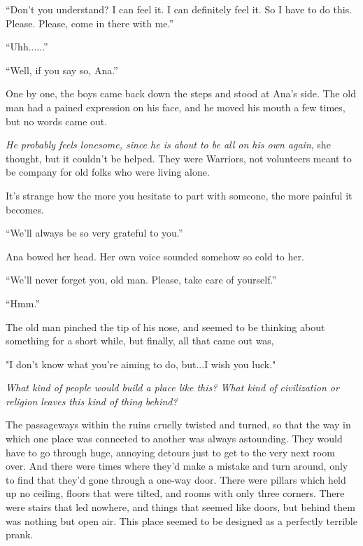 \documentclass[
]{article}
\begin{document}
``Don't you understand? I can feel it. I can definitely feel it. So I
have to do this. Please. Please, come in there with me.''

``Uhh......''

``Well, if you say so, Ana.''

One by one, the boys came back down the steps and stood at Ana's side.
The old man had a pained expression on his face, and he moved his mouth
a few times, but no words came out.

\emph{He probably feels lonesome, since he is about to be all on his own
again}, she thought, but it couldn't be helped. They were Warriors, not
volunteers meant to be company for old folks who were living alone.

It's strange how the more you hesitate to part with someone, the more
painful it becomes.

``We'll always be so very grateful to you.''

Ana bowed her head. Her own voice sounded somehow so cold to her.

``We'll never forget you, old man. Please, take care of yourself.''

``Hmm.''

The old man pinched the tip of his nose, and seemed to be thinking about
something for a short while, but finally, all that came out was,

"I don't know what you're aiming to do, but...I wish you luck."

\emph{What kind of people would build a place like this? What kind of
civilization or religion leaves this kind of thing behind?}

The passageways within the ruins cruelly twisted and turned, so that the
way in which one place was connected to another was always astounding.
They would have to go through huge, annoying detours just to get to the
very next room over. And there were times where they'd make a mistake
and turn around, only to find that they'd gone through a one-way door.
There were pillars which held up no ceiling, floors that were tilted,
and rooms with only three corners. There were stairs that led nowhere,
and things that seemed like doors, but behind them was nothing but open
air. This place seemed to be designed as a perfectly terrible prank.
\end{document}
